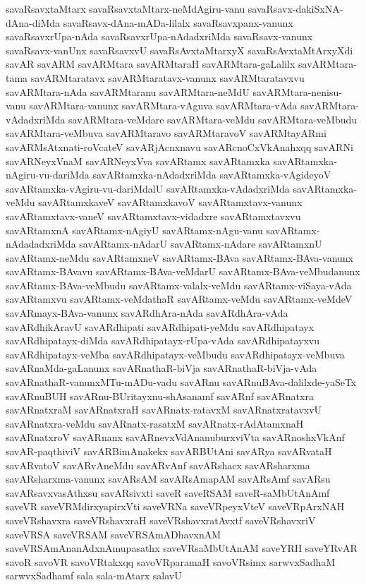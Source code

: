 {savaRsavxtaMtarx
savaRsavxtaMtarx-neMdAgiru-vanu
savaRsavx-dakiSxNA-dAna-diMda
savaRsavx-dAna-mADa-lilalx
savaRsavxpanx-vanunx
savaRsavxrUpa-nAda
savaRsavxrUpa-nAdadxriMda
savaRsavx-vanunx
savaRsavx-vanUnx
savaRsavxvU
savaRsAvxtaMtarxyX
savaRsAvxtaMtArxyXdi
savAR
savARM
savARMtara
savARMtaraH
savARMtara-gaLalilx
savARMtara-tama
savARMtaratavx
savARMtaratavx-vanunx
savARMtaratavxvu
savARMtara-nAda
savARMtaranu
savARMtara-neMdU
savARMtara-nenisu-vanu
savARMtara-vanunx
savARMtara-vAguva
savARMtara-vAda
savARMtara-vAdadxriMda
savARMtara-veMdare
savARMtara-veMdu
savARMtara-veMbudu
savARMtara-veMbuva
savARMtaravo
savARMtaravoV
savARMtayARmi
savARMsAtxnati-roVcateV
savARjAcnxnavu
savARcnoCxVkAnahxqq
savARNi
savARNeyxVnaM
savARNeyxVva
savARtamx
savARtamxka
savARtamxka-nAgiru-vu-dariMda
savARtamxka-nAdadxriMda
savARtamxka-vAgideyoV
savARtamxka-vAgiru-vu-dariMdalU
savARtamxka-vAdadxriMda
savARtamxka-veMdu
savARtamxkaveV
savARtamxkavoV
savARtamxtavx-vanunx
savARtamxtavx-vaneV
savARtamxtavx-vidadxre
savARtamxtavxvu
savARtamxnA
savARtamx-nAgiyU
savARtamx-nAgu-vanu
savARtamx-nAdadadxriMda
savARtamx-nAdarU
savARtamx-nAdare
savARtamxnU
savARtamx-neMdu
savARtamxneV
savARtamx-BAva
savARtamx-BAva-vanunx
savARtamx-BAvavu
savARtamx-BAva-veMdarU
savARtamx-BAva-veMbudanunx
savARtamx-BAva-veMbudu
savARtamx-valalx-veMdu
savARtamx-viSaya-vAda
savARtamxvu
savARtamx-veMdathaR
savARtamx-veMdu
savARtamx-veMdeV
savARmayx-BAva-vanunx
savARdhAra-nAda
savARdhAra-vAda
savARdhikAravU
savARdhipati
savARdhipati-yeMdu
savARdhipatayx
savARdhipatayx-diMda
savARdhipatayx-rUpa-vAda
savARdhipatayxvu
savARdhipatayx-veMba
savARdhipatayx-veMbudu
savARdhipatayx-veMbuva
savARnaMda-gaLanunx
savARnathaR-biVja
savARnathaR-biVja-vAda
savARnathaR-vanunxMTu-mADu-vadu
savARnu
savARnuBAva-dalilxde-yaSeTx
savARnuBUH
savARnu-BUritayxnu-shAsanamf
savARnf
savARnatxra
savARnatxraM
savARnatxraH
savARnatx-ratavxM
savARnatxratavxvU
savARnatxra-veMdu
savARnatx-rasatxM
savARnatx-rAdAtamxnaH
savARnatxroV
savARnanx
savARnevxVdAnanuburxviVta
savARnoshxVkAnf
savAR-paqthiviV
savARBimAnakekx
savARBUtAni
savARya
savARvataH
savARvatoV
savARvAneMdu
savARvAnf
savARshacx
savARsharxma
savARsharxma-vanunx
savARsAM
savARsAmapAM
savARsAmf
savARsu
savARsavxvasAthxsu
savARsivxti
saveR
saveRSAM
saveR-saMbUtAnAmf
saveVR
saveVRMdirxyapirxVti
saveVRNa
saveVRpeyxVteV
saveVRpArxNAH
saveVRshavxra
saveVRshavxraH
saveVRshavxratAvxtf
saveVRshavxriV
saveVRSA
saveVRSAM
saveVRSAmADhavxnAM
saveVRSAmAnanAdxnAmupasathx
saveVRsaMbUtAnAM
saveYRH
saveYRvAR
savoR
savoVR
savoVRtakxqq
savoVRparamaH
savoVRsimx
sarwvxSadhaM
sarwvxSadhamf
sala
sala-mAtarx
salavU
}
